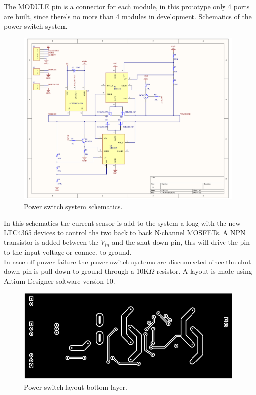 The MODULE pin is a connector for each module, in this prototype only 4 ports are built, since there's no more than 4 modules in development.
%
Schematics of the power switch system.
\begin{figure}[H]
	\begin{centering}
		\includegraphics[width=1.0\textwidth]{images/PS_PCB.pdf}
		\caption{Power switch system schematics.}
	\end{centering}
\end{figure}
In this schematics the current sensor is add to the system a long with the new LTC4365 devices to control the two back to back N-channel MOSFETs. A NPN transistor is added between the $ V_{in} $ and the shut down pin, this will drive the pin to the input voltage or connect to ground. \\
In case off power failure the power switch systems are disconnected since the shut down pin is pull down to ground through a 10K$ \Omega $ resistor.
A layout is made using Altium Designer software version 10. 
%
\begin{figure}[H]
	\begin{centering}
		\includegraphics[width=1.0\textwidth]{images/tb5_layout_bottom.png}
		\caption{Power switch layout bottom layer.}
	\end{centering}
\end{figure}
